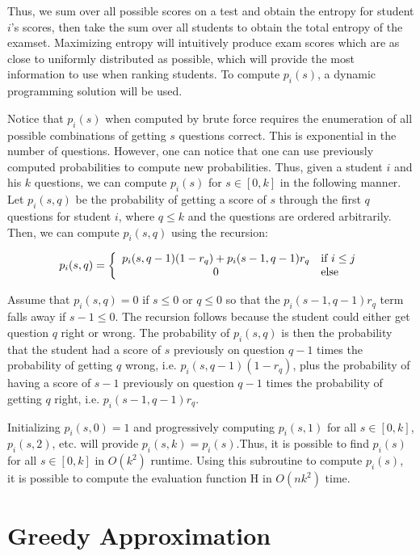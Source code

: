 \documentclass[psamsfonts]{amsart}
\begin{document}
Thus, we sum over all possible scores on a test and obtain the entropy for student $i$'s scores, then take the sum over all students to obtain the total entropy of the examset. Maximizing entropy will intuitively produce exam scores which are as close to uniformly distributed as possible, which will provide the most information to use when ranking students. To compute $p_{i}(s)$, a dynamic programming solution will be used.

Notice that $p_i(s)$ when computed by brute force requires the enumeration of all possible combinations of getting $s$ questions correct. This is exponential in the number of questions. However, one can notice that one can use previously computed probabilities to compute new probabilities. Thus, given a student $i$ and his $k$ questions, we can compute $p_i(s)$ for $s \in [0, k]$ in the following manner. Let $p_i(s, q)$ be the probability of getting a score of $s$ through the first $q$ questions for student $i$, where $q \leq k$ and the questions are ordered arbitrarily. Then, we can compute $p_i(s, q)$ using the recursion:

\begin{eqnarray}
p_i(s, q) = \left\{ \begin{array}{c l}
p_i(s, q-1) (1-r_q) + p_i(s-1,q-1) r_q & \text{if } i \leq j \\ 
0 & \text{else}
\end{array} \right.
\end{eqnarray}

Assume that $p_i(s,q) = 0$ if $s \leq 0$ or $q \leq 0$ so that the $p_i(s-1, q-1) r_q$ term falls away if $s-1 \leq 0$. The recursion follows because the student could either get question $q$ right or wrong. The probability of $p_i(s, q)$ is then the probability that the student had a score of $s$ previously on question $q-1$ times the probability of getting $q$ wrong, i.e. $p_i(s, q-1) (1 - r_q)$, plus the probability of having a score of $s-1$ previously on question $q-1$ times the probability of getting $q$ right, i.e. $p_i(s-1, q-1) r_q$.

Initializing $p_i(s, 0) = 1$ and progressively computing $p_i(s, 1)$ for all $s \in [0,k]$, $p_i(s, 2)$, etc. will provide $p_i(s, k) = p_i(s)$.Thus, it is possible to find $p_i(s)$ for all $s \in [0,k]$ in $O(k^2)$ runtime. Using this subroutine to compute $p_i(s)$, it is possible to compute the evaluation function $\mathrm{H}$ in $O(n k^2)$ time.

\section{Greedy Approximation}
\end{document}
